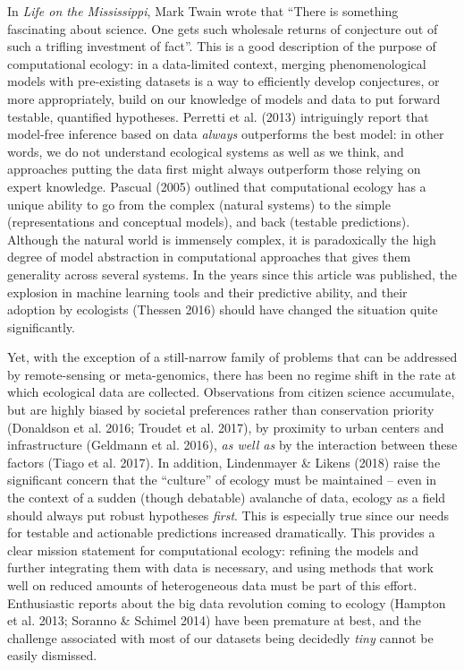 \documentclass[12pt]{article}
\begin{document}
In \emph{Life on the Mississippi}, Mark Twain wrote that \enquote{There
is something fascinating about science. One gets such wholesale returns
of conjecture out of such a trifling investment of fact}. This is a good
description of the purpose of computational ecology: in a data-limited
context, merging phenomenological models with pre-existing datasets is a
way to efficiently develop conjectures, or more appropriately, build on
our knowledge of models and data to put forward testable, quantified
hypotheses. Perretti et al. (2013) intriguingly report that model-free
inference based on data \emph{always} outperforms the best model: in
other words, we do not understand ecological systems as well as we
think, and approaches putting the data first might always outperform
those relying on expert knowledge. Pascual (2005) outlined that
computational ecology has a unique ability to go from the complex
(natural systems) to the simple (representations and conceptual models),
and back (testable predictions). Although the natural world is immensely
complex, it is paradoxically the high degree of model abstraction in
computational approaches that gives them generality across several
systems. In the years since this article was published, the explosion in
machine learning tools and their predictive ability, and their adoption
by ecologists (Thessen 2016) should have changed the situation quite
significantly.

Yet, with the exception of a still-narrow family of problems that can be
addressed by remote-sensing or meta-genomics, there has been no regime
shift in the rate at which ecological data are collected. Observations
from citizen science accumulate, but are highly biased by societal
preferences rather than conservation priority (Donaldson et al. 2016;
Troudet et al. 2017), by proximity to urban centers and infrastructure
(Geldmann et al. 2016), \emph{as well as} by the interaction between
these factors (Tiago et al. 2017). In addition, Lindenmayer \& Likens
(2018) raise the significant concern that the \enquote{culture} of
ecology must be maintained -- even in the context of a sudden (though
debatable) avalanche of data, ecology as a field should always put
robust hypotheses \emph{first}. This is especially true since our needs
for testable and actionable predictions increased dramatically. This
provides a clear mission statement for computational ecology: refining
the models and further integrating them with data is necessary, and
using methods that work well on reduced amounts of heterogeneous data
must be part of this effort. Enthusiastic reports about the big data
revolution coming to ecology (Hampton et al. 2013; Soranno \& Schimel
2014) have been premature at best, and the challenge associated with
most of our datasets being decidedly \emph{tiny} cannot be easily
dismissed.
\end{document}
